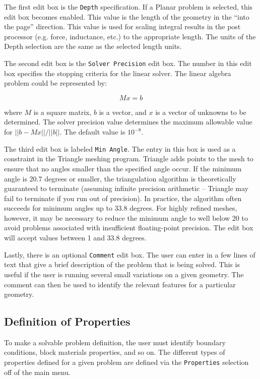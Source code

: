 \documentclass[12pt]{report}
\begin{document}
The first edit box is the \texttt{Depth} specification. If a Planar
problem is selected, this edit box becomes enabled. This value is
the length of the geometry in the ``into the page'' direction. This
value is used for scaling integral results in the post processor
(e.g. force, inductance, etc.) to the appropriate length. The units
of the Depth selection are the same as the selected length units.

The second edit box is the \texttt{Solver Precision} edit box. The
number in this edit box specifies the stopping criteria for the
linear solver. The linear algebra problem could be represented by:

\begin{equation}
M x = b
\end{equation}

\noindent
where $M$ is a square matrix, $b$ is a vector, and $x$ is a vector of
unknowns to be determined. The solver precision value determines the maximum
allowable value for $\vert \vert b - Mx\vert \vert / \vert \vert b\vert
\vert $. The default value is $10^{ - 8}$.

The third edit box is labeled {\tt Min Angle}.  The entry in this box is used as a
constraint in the Triangle meshing program.  Triangle adds points to the mesh to
ensure that no angles smaller than the specified angle occur. If the minimum angle
is 20.7 degrees or smaller, the triangulation algorithm is theoretically guaranteed to
terminate (assuming infinite precision arithmetic -- Triangle may
fail to terminate if you run out of precision).  In practice, the
algorithm often succeeds for minimum angles up to 33.8 degrees.
For highly refined meshes, however, it may be necessary to reduce
the minimum angle to well below 20 to avoid problems associated
with insufficient floating-point precision.  The edit box will accept
values between 1 and 33.8 degrees.

Lastly, there is an optional \texttt{Comment} edit box. The user
can enter in a few lines of text that give a brief description of
the problem that is being solved. This is useful if the user is
running several small variations on a given geometry. The comment
can then be used to identify the relevant features for a particular
geometry.

\subsection{Definition of Properties}

To make a solvable problem definition, the user must identify boundary
conditions, block materials properties, and so on. The different types of
properties defined for a given problem are defined via the
\texttt{Properties} selection off of the main menu.
\end{document}

